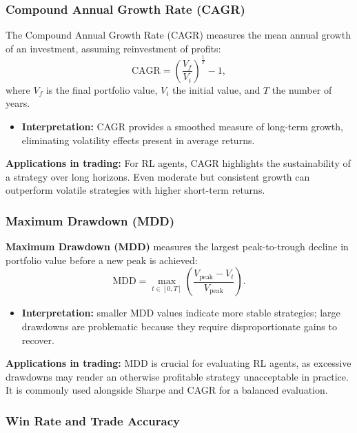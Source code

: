\documentclass[12pt,a4paper]{report}
\begin{document}
\subsubsection{Compound Annual Growth Rate (CAGR)}

The Compound Annual Growth Rate (CAGR) measures the mean annual growth of an investment, assuming reinvestment of profits:
\[
\text{CAGR} = \left( \frac{V_f}{V_i} \right)^{\tfrac{1}{T}} - 1,
\]
where $V_f$ is the final portfolio value, $V_i$ the initial value, and $T$ the number of years.  

\begin{itemize}
    \item \textbf{Interpretation:} CAGR provides a smoothed measure of long-term growth, eliminating volatility effects present in average returns.
\end{itemize}

\bigskip
\textbf{Applications in trading:}  
For RL agents, CAGR highlights the sustainability of a strategy over long horizons. Even moderate but consistent growth can outperform volatile strategies with higher short-term returns.

\subsubsection{Maximum Drawdown (MDD)}

\textbf{Maximum Drawdown (MDD)} measures the largest peak-to-trough decline in portfolio value before a new peak is achieved:
\[
\text{MDD} = \max_{t \in [0,T]} \left( \frac{V_{\text{peak}} - V_t}{V_{\text{peak}}} \right).
\]

\begin{itemize}
    \item \textbf{Interpretation:} smaller MDD values indicate more stable strategies; large drawdowns are problematic because they require disproportionate gains to recover.
\end{itemize}

\bigskip
\textbf{Applications in trading:}  
MDD is crucial for evaluating RL agents, as excessive drawdowns may render an otherwise profitable strategy unacceptable in practice. It is commonly used alongside Sharpe and CAGR for a balanced evaluation.

\subsubsection{Win Rate and Trade Accuracy}
\end{document}

